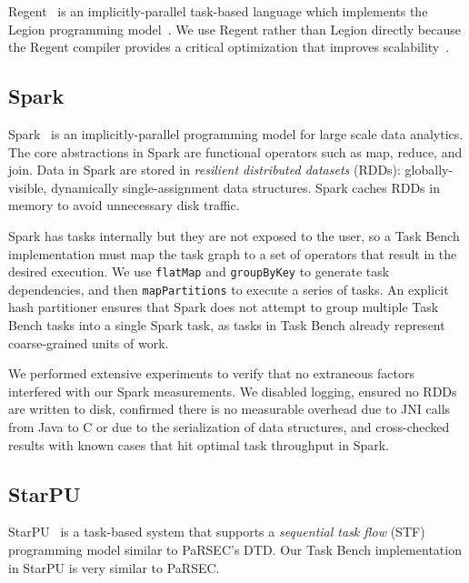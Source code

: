 Regent~\cite{Regent15} is an implicitly-parallel task-based language
which implements the Legion programming model~\cite{Legion12}. We use
Regent rather than Legion directly because the Regent compiler
provides a critical optimization that
improves scalability~\cite{ControlReplication17}.

\subsection{Spark}

Spark~\cite{Spark10} is an implicitly-parallel programming model for
large scale data analytics.
The core abstractions in Spark are functional operators such as map,
reduce, and join. Data in Spark are stored in
\emph{resilient
  distributed datasets} (RDDs): globally-visible,
dynamically single-assignment data structures. Spark caches RDDs in memory to avoid unnecessary
disk traffic.

Spark has tasks internally but they are not exposed to the user,
so a Task Bench implementation must map the task graph to a set of operators that result in the
desired execution. We use
\lstinline[language=Scala]{flatMap} and
\lstinline[language=Scala]{groupByKey} to generate task
dependencies, and then \lstinline[language=Scala]{mapPartitions} to execute a
series of tasks. An explicit hash partitioner ensures that
Spark does not attempt to group multiple Task Bench tasks into a
single Spark task, as tasks in Task Bench already represent coarse-grained units of work.

We performed extensive experiments to verify that no
extraneous factors interfered with our Spark measurements. We
disabled logging, ensured no RDDs are written
to disk, confirmed there is no measurable overhead due to JNI
calls from Java to C or due to the serialization of data structures, and cross-checked results with known cases
that hit optimal task throughput in Spark.

\subsection{StarPU}

StarPU~\cite{StarPU11} is a task-based system that supports a \emph{sequential task flow} (STF)
programming model similar to PaRSEC's DTD. Our Task Bench implementation in
StarPU is very similar to PaRSEC.

